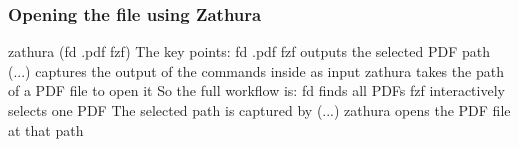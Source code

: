\documentclass [ titlepage ]{article}
\begin{document}
\subsubsection{ Opening the file using Zathura}
zathura \textdollar (fd .pdf \textbar \space fzf) \newline
The key points: \newline
fd .pdf \textbar \space fzf outputs the selected PDF path \newline
\textdollar (...) captures the output of the commands inside as input \newline
zathura takes the path of a PDF file to open it \newline
So the full workflow is: \newline
fd finds all PDFs \newline
fzf interactively selects one PDF \newline
The selected path is captured by \textdollar (...) \newline
zathura opens the PDF file at that path \newline
\end{document}
